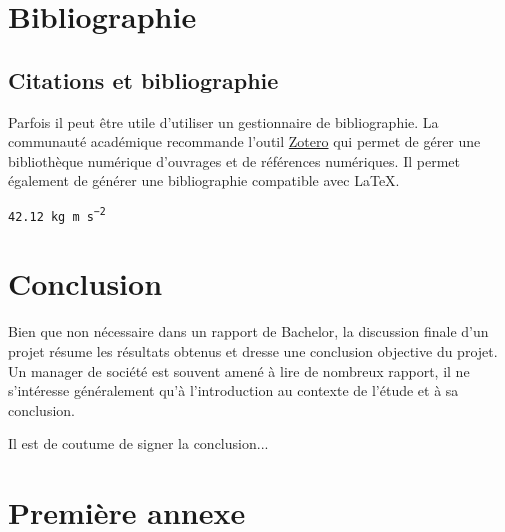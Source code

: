 \documentclass[
    iai, %
    il, %
]{heig-tb}
\begin{document}
\chapter{Bibliographie}
\section{Citations et bibliographie}

Parfois il peut être utile d'utiliser un gestionnaire de bibliographie. La communauté académique recommande l'outil \href{https://www.zotero.org/}{Zotero} qui permet de gérer une bibliothèque numérique d'ouvrages et de références numériques. Il permet également de générer une bibliographie compatible avec \LaTeX.


\texttt{\SI{42.12}{\kilo\gram\metre\per\square\second}}\par

\chapter{Conclusion}

Bien que non nécessaire dans un rapport de Bachelor, la discussion finale d'un projet résume les résultats obtenus et dresse une conclusion objective du projet. Un manager de société est souvent amené à lire de nombreux rapport, il ne s'intéresse généralement qu'à l'introduction au contexte de l'étude et à sa conclusion.

Il est de coutume de signer la conclusion...

\vfil
\hspace{8cm}\makeatletter\@author\makeatother\par
\hspace{8cm}\begin{minipage}{5cm}
    \printsignature
\end{minipage}
\clearpage

\appendix
\appendixpage
\addappheadtotoc

\chapter{Première annexe}
\end{document}
